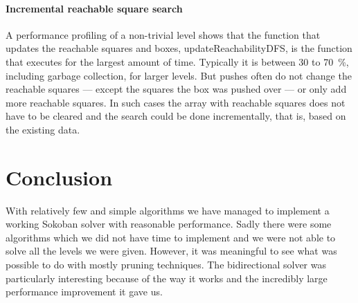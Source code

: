 \documentclass[a4paper,12pt]{article}
\renewcommand{\*}[0]{\cdot}
\begin{document}
\subsection{Incremental reachable square search}

A performance profiling of a non-trivial level shows that the function that
updates the reachable squares and boxes, updateReachabilityDFS, is the function
that executes for the largest amount of time. Typically it is between 30 to
70~\%, including garbage collection, for larger levels. But pushes often do not
change the reachable squares --- except the squares the box was pushed over ---
or only add more reachable squares. In such cases the array with reachable
squares does not have to be cleared and the search could be done incrementally,
that is, based on the existing data.


\part*{Conclusion}


With relatively few and simple algorithms we have managed to implement a
working Sokoban solver with reasonable performance. Sadly there were some
algorithms which we did not have time to implement and we were not able to
solve all the levels we were given. However, it was meaningful to see what was
possible to do with mostly pruning techniques. The bidirectional solver was
particularly interesting because of the way it works and the incredibly large
performance improvement it gave us.



 
\end{document}

